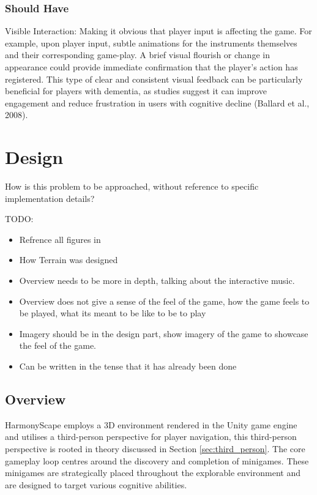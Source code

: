 \documentclass{l4proj}
\begin{document}
\subsection{Should Have}
Visible Interaction: Making it obvious that player input is affecting the game. For example, upon player input, subtle animations for the instruments themselves and their corresponding game-play. A brief visual flourish or change in appearance could provide immediate confirmation that the player's action has registered. This type of clear and consistent visual feedback can be particularly beneficial for players with dementia, as studies suggest it can improve engagement and reduce frustration in users with cognitive decline (Ballard et al., 2008).


\chapter{Design}
How is this problem to be approached, without reference to specific implementation details? 

TODO:
\begin{itemize}
    \item Refrence all figures in
    \item How Terrain was designed
    \item Overview needs to be more in depth, talking about the interactive music.
    \item Overview does not give a sense of the feel of the game, how the game feels to be played, what its meant to be like to be to play
    \item Imagery should be in the design part, show imagery of the game to showcase the feel of the game.
    \item Can be written in the tense that it has already been done
\end{itemize}



\section{Overview}
HarmonyScape employs a 3D environment rendered in the Unity game engine and utilises a third-person perspective for player navigation, this third-person perspective is rooted in theory discussed in Section \ref{sec:third_person}.  The core gameplay loop centres around the discovery and completion of minigames. These minigames are strategically placed throughout the explorable environment and are designed to target various cognitive abilities.
\end{document}
